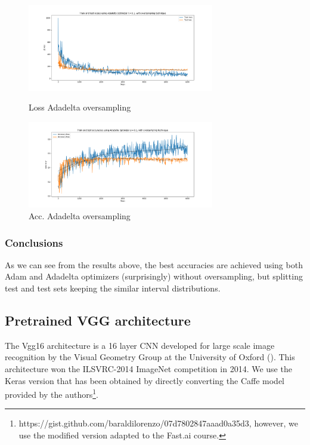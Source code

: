 \documentclass{article}
\begin{document}
\begin{figure}
 
  \begin{minipage}[b]{0.5\linewidth}
    \centering
    \includegraphics[width=1.1\linewidth, height = 3.8cm]{loss_adadel_oversample.png} 
    \caption{Loss Adadelta oversampling} 
  \end{minipage}
  \begin{minipage}[b]{0.5\linewidth}
    \centering
    \includegraphics[width=1.1\linewidth, height = 3.8cm]{acc_adadel_oversample.png} 
    \caption{Acc. Adadelta oversampling}
  \end{minipage} 
\end{figure}

\newpage
\subsubsection{Conclusions}
As we can see from the results above, the best accuracies are achieved using both Adam and Adadelta optimizers (surprisingly) without oversampling, but splitting test and test sets keeping the similar interval distributions. 








\subsection{Pretrained VGG architecture}
The Vgg16 architecture is a 16 layer CNN developed for large scale image recognition by the Visual Geometry Group at the University of Oxford (\cite{SZ14}). This architecture won the ILSVRC-2014 ImageNet competition in 2014. We use the Keras version that has been obtained by directly converting the Caffe model provided by the authors\footnote{https://gist.github.com/baraldilorenzo/07d7802847aaad0a35d3, however, we use the modified version adapted to the Fast.ai course.}.
\end{document}
